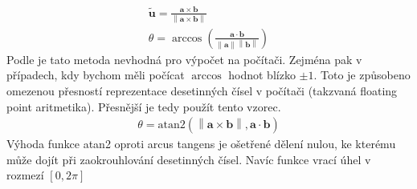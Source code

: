 \documentclass[twoside]{ctuthesis}
\newcommand{\norm}[1]{\left\lVert#1\right\rVert}
\begin{document}
\begin{align}
    \tilde{\mathbf{u}} = \frac{\mathbf{a} \times \mathbf{b}}{\norm{\mathbf{a}\times \mathbf{b}}}\\
    \theta = \arccos \left( \frac{\mathbf{a} \cdot \mathbf{b}}{\norm{\mathbf{a}}\norm{\mathbf{b}}} \right)
\end{align}
Podle \cite{james_w_angle_2014} je tato metoda nevhodná pro výpočet na počítači. Zejména pak v případech, kdy bychom měli počícat $\arccos$ hodnot blízko $\pm 1$. Toto je způsobeno omezenou přesností reprezentace desetinných čísel v počítači (takzvaná floating point aritmetika). Přesnější je tedy použít tento vzorec.
\begin{align}
    \theta = \text{atan2}\left( \norm{\mathbf{a} \times \mathbf{b}}, \mathbf{a}\cdot \mathbf{b} \right) 
\end{align}
Výhoda funkce atan2 oproti arcus tangens je ošetřené dělení nulou, ke kterému může dojít při zaokrouhlování desetinných čísel. Navíc funkce vrací úhel v rozmezí $\left[ 0, 2\pi \right]$
\end{document}

